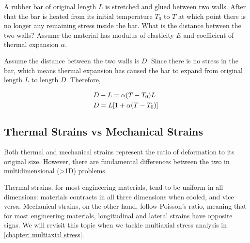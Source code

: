 \documentclass[
10pt,
a4paper,
openany,
svgnames,
]{book} %
\begin{document}
\begin{example}
  
  A rubber bar of original length $L$ is stretched and glued between two walls. After that the bar is heated from its initial temperature $T_0$ to $T$ at which point there is no longer any remaining stress inside the bar. What is the distance between the two walls? Assume the material has modulus of elasticity $E$ and coefficient of thermal expansion $\alpha$.
  
  \begin{figure}[H]
    \centering
  \end{figure}
  
\end{example}
\begin{solution}
  Assume the distance between the two walls is $D$. Since there is no stress in the bar, which means thermal expansion has caused the bar to expand from original length $L$ to length $D$. Therefore,
  
\[\begin{gathered}
  D - L = \alpha (T - {T_0})L \hfill \\
  D = L[1 + \alpha (T - {T_0})] \hfill \\ 
\end{gathered}\]
	
\end{solution}

\subsection{Thermal Strains vs Mechanical Strains}

Both thermal and mechanical strains represent the ratio of deformation to its original size. However, there are fundamental differences between the two in multidimensional (>1D) problems.

Thermal strains, for most engineering materials, tend to be uniform in all dimensions: materials contracts in all three dimensions when cooled, and vice versa. Mechanical strains, on the other hand, follow Poisson's ratio, meaning that for most engineering materials, longitudinal and lateral strains have opposite signs. We will revisit this topic when we tackle multiaxial stress analysis in \cref{chapter: multiaxial stress}.
\end{document}

